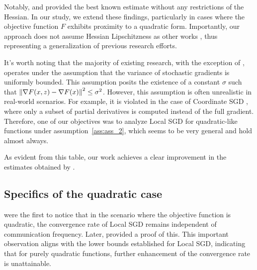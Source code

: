 \vspace{10pt}

Notably, \cite{Khaled} and \cite{Woodworth} provided the best known estimate without any restrictions of the Hessian. In our study, we extend these findings, particularly in cases where the objective function $F$ exhibits proximity to a quadratic form. Importantly, our approach does not assume Hessian Lipschitzness as other works \cite{FedAC}, thus representing a generalization of previous research efforts.

\vspace{10pt}

It's worth noting that the majority of existing research, with the exception of \cite{Spiridonoff}, operates under the assumption that the variance of stochastic gradients is uniformly bounded. This assumption posits the existence of a constant $\sigma$ such that $\left\|\nabla F(x, z) - \nabla F(x)\right\|^2 \leq \sigma^2$. However, this assumption is often unrealistic in real-world scenarios. For example, it is violated in the case of Coordinate SGD \citep{coordinateSGD}, where only a subset of partial derivatives is computed instead of the full gradient. Therefore, one of our objectives was to analyze Local SGD for quadratic-like functions under assumption~\ref{ass:ass_2}, which seems to be very general and hold almost always.



As evident from this table, our work achieves a clear improvement in the estimates obtained by \cite{Khaled}.



\subsection{Specifics of the quadratic case}

\cite{earlyquadratics} were the first to notice that in the scenario where the objective function is quadratic, the convergence rate of Local SGD remains independent of communication frequency. Later, \cite{Woodworth} provided a proof of this. This important observation aligns with the lower bounds established for Local SGD, indicating that for purely quadratic functions, further enhancement of the convergence rate is unattainable.

